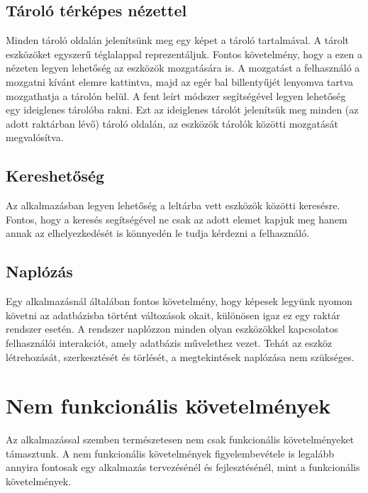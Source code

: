 \subsection{Tároló térképes nézettel}
Minden tároló oldalán jelenítsünk meg egy képet a tároló tartalmával.
A tárolt eszközöket egyszerű téglalappal reprezentáljuk.
Fontos követelmény, hogy a ezen a nézeten legyen lehetőség az eszközök mozgatására is.
A mozgatást a felhasználó a mozgatni kívánt elemre kattintva, majd az egér bal billentyűjét lenyomva tartva mozgathatja a tárolón belül.
A fent leírt módszer segítségével legyen lehetőség egy ideiglenes tárolóba rakni. 
Ezt az ideiglenes tárolót jelenítsük meg minden (az adott raktárban lévő) tároló oldalán, az eszközök tárolók közötti mozgatását megvalósítva.

\subsection{Kereshetőség}
Az alkalmazásban legyen lehetőség a leltárba vett eszközök közötti keresésre.
Fontos, hogy a keresés segítségével ne csak az adott elemet kapjuk meg hanem annak az elhelyezkedését is könnyedén le tudja kérdezni a felhasználó.

\subsection{Naplózás}
Egy alkalmazásnál általában fontos követelmény, hogy képesek legyünk nyomon követni az adatbázisba történt változások okait, különösen igaz ez egy raktár rendszer esetén.
A rendszer naplózzon minden olyan eszközökkel kapcsolatos felhasználói interakciót, amely adatbázis művelethez vezet.
Tehát az eszköz létrehozását, szerkesztését és törlését, a megtekintések naplózása nem szükséges.

\section{Nem funkcionális követelmények}

Az alkalmazással szemben természetesen nem csak funkcionális követelményeket támasztunk.
A nem funkcionális követelmények figyelembevétele is legalább annyira fontosak egy alkalmazás tervezésénél és fejlesztésénél, mint a funkcionális követelmények.

